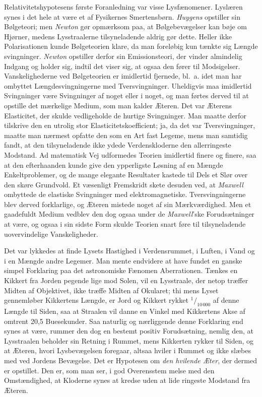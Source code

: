 \documentclass[12pt,a4paper]{article}
\newcommand{\opage}[1]{\marginnote{\footnotesize\textit{[#1]}}}
\begin{document}
Relativitetshypotesens første Foranledning var visse Lysfænomener. Lyslæren
synes i det hele at være et af Fysikernes Smertensbørn. \emph{Huygens}
opstiller sin Bølgeteori; men \emph{Newton} gør opmærksom paa, at
Bølgebevægelser kan bøje om Hjørner, medens Lysstraalerne tilsyneladende
aldrig gør dette. Heller ikke Polarisationen kunde Bølgeteorien klare, da man
foreløbig kun tænkte sig Længde\-%
\opage{3}svingninger. \emph{Newton} opstiller derfor sin Emissionsteori, der vinder
almindelig Indgang og holder sig, indtil det viser sig, at ogsaa den fører til
Modsigelser. Vanskelighederne ved Bølgeteorien er imidlertid fjernede, bl.\ a.
idet man har ombyttet Længdesvingningerne med Tversvingninger. Uheldigvis maa
imidlertid Svingninger være Svingninger af noget eller i noget, og man førtes
derved til at opstille det mærkelige \guillemotleft Medium\guillemotright, som
man kalder Æteren. Det var Æterens Elasticitet, der skulde vedligeholde de
hurtige Svingninger. Man maatte derfor tilskrive den en utrolig stor
Elasticitetskoefficient; ja, da det var Tversvingninger, maatte man nærmest
opfatte den som en Art fast Legeme, mens man samtidig fandt, at den
tilsyneladende ikke ydede Verdenskloderne den allerringeste Modstand. Ad
matematisk Vej udformedes Teorien imidlertid finere og finere, saa at den
efterhaanden kunde give den ypperligste Løsning af en Mængde Enkeltproblemer,
og de mange elegante Resultater kastede til Dels et Slør over den skøre
Grundvold. Et væsenligt Fremskridt skete desuden ved, at \emph{Maxwell}
ombyttede de elastiske Svingninger med elektromagnetiske. Tversvingningerne
blev derved forklarlige, og Æteren mistede noget af sin Mærkværdighed. Men et
gaadefuldt Medium vedblev den dog ogsaa under de \emph{Maxwell}'ske
Forudsætninger at være, og ogsaa i sin sidste Form skulde Teorien snart føre
til tilsyneladende uovervindelige Vanskeligheder.

Det var lykkedes at finde Lysets Hastighed i Verdensrummet, i Luften, i Vand
og i en Mængde andre Legemer. Man mente endvidere at have fundet en ganske
simpel Forklaring paa det astronomiske Fænomen Aberrationen. Tænkes en Kikkert
fra Jorden pegende lige mod Solen, vil en Lysstraale, der netop træffer Midten
af Objektivet, ikke træffe Midten af Okularet; thi mens Lyset gennemløber
Kikkertens Længde, er Jord og Kikkert rykket $^{1}\!/_{10\,000}$ af denne
Længde til Siden, saa at Straalen vil danne en Vinkel med Kikkertens Akse af
omtrent 20,5 Buesekunder. Saa naturlig og nærliggende denne Forklaring end
synes at være, rummer den dog en bestemt positiv Forudsætning, nemlig den, at
Lysstraalen beholder sin Retning i Rummet, mens Kikkerten rykker til Siden, og
at Æteren, hvori Lysbevægelsen foregaar, altsaa hviler i Rummet og ikke slæbes
med ved Jordens Bevægelse. Det er Hypotesen om \emph{den hvilende Æter}, der
dermed er opstillet. Den er, som man ser, i god Overensstem\-%
\opage{4}melse med den Omstændighed, at Kloderne synes at kredse uden at lide ringeste
Modstand fra Æteren.
\end{document}
